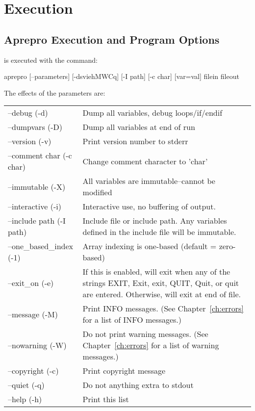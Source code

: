 \chapter{Execution}\label{ch:execution}

\section{Aprepro Execution and Program Options}
\aprepro{} is executed with the command:
\begin{apinp}
aprepro [--parameters] [-dsviehMWCq] [-I path] [-c char] [var=val] filein fileout
\end{apinp}

The effects of the parameters are:
\begin{longtable}{lp{5.0in}}
--debug (-d) &  Dump all variables, debug loops/if/endif \\
--dumpvars (-D) & Dump all variables at end of run \\
--version (-v) &  Print version number to stderr           \\
--comment char (-c char) &  Change comment character to 'char'       \\
--immutable (-X) &  All variables are immutable--cannot be modified \\
--interactive (-i) &  Interactive use, no buffering of output.       \\
--include path (-I path) &  Include file or include path. Any variables defined in the include file will be immutable.\\
--one\_based\_index (-1) & Array indexing is one-based (default = zero-based) \\
--exit\_on (-e) &  If this is enabled, \aprepro{} will exit when any of the strings
EXIT, Exit, exit, QUIT, Quit, or quit are entered. Otherwise, \aprepro{} will exit at end of
file. \\
--message (-M) &  Print INFO messages. (See Chapter~\ref{ch:errors} for a list of INFO messages.) \\
--nowarning (-W) &  Do not print warning messages. (See Chapter~\ref{ch:errors} for a list of warning messages.) \\
--copyright (-c) &  Print copyright message                  \\
--quiet (-q) &  Do not anything extra to stdout          \\
--help (-h) &  Print this list                          \\


\end{longtable}
